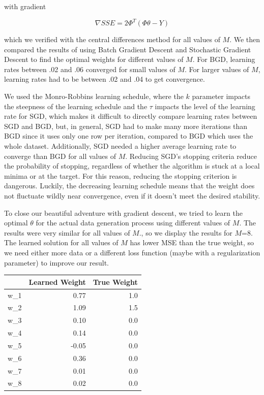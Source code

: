 \documentclass[10pt]{article}
\begin{document}
with gradient 

\begin{equation*}
	\nabla SSE = 2\Phi^T(\Phi \theta-Y)
\end{equation*}

 which we verified with the central differences method for all values of $M$. We then compared the results of using Batch Gradient Descent and Stochastic Gradient Descent to find the optimal weights for different values of $M$. For BGD, learning rates between .02 and .06 converged for small values of $M$. For larger values of $M$,  learning rates had to be between .02 and .04 to get convergence.
 
We used the Monro-Robbins learning schedule, where  the $k$ parameter impacts the steepness of the learning schedule and the $\tau$ impacts the level of the learning rate for SGD, which makes it difficult to directly compare learning rates between SGD and BGD, but, in general, SGD had to make many more iterations than BGD since it uses only one row per iteration, compared to BGD which uses the whole dataset. Additionally, SGD needed a higher average learning rate to converge than BGD for all values of $M$.
 Reducing SGD's stopping criteria reduce the probability of stopping, regardless of whether the algorithm is stuck at a local minima or at the target. For this reason, reducing the stopping criterion is dangerous. Luckily, the decreasing learning schedule means that the weight does not fluctuate wildly near convergence, even if it doesn't meet the desired stability. 
 

To close our beautiful adventure with gradient descent, we tried to learn the optimal $\theta$ for the actual data generation process using different values of $M$. The results were very similar for all values of $M$., so we display the results for $M$=8.  The learned solution for all values of $M$ has lower MSE than the true weight, so we need either more data or a different loss function (maybe with a regularization parameter) to improve our result. 
\begin{centering}
\begin{table}

\begin{tabular}{lrr}
\toprule
{} &  Learned Weight &  True Weight \\
\midrule
w\_1 &            0.77 &          1.0 \\
w\_2 &            1.09 &          1.5 \\
w\_3 &            0.10 &          0.0 \\
w\_4 &            0.14 &          0.0 \\
w\_5 &           -0.05 &          0.0 \\
w\_6 &            0.36 &          0.0 \\
w\_7 &            0.01 &          0.0 \\
w\_8 &            0.02 &          0.0 \\
\bottomrule
\end{tabular}

\end{table}
\end{centering}
\end{document}
